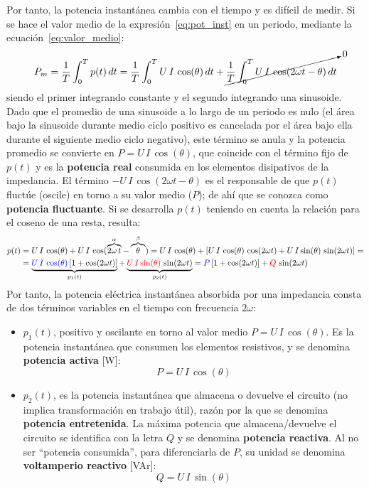Por tanto, la potencia instantánea cambia con el tiempo y es difícil
de medir. Si se hace el valor medio de la
expresión~\eqref{eq:pot_inst} en un periodo, mediante la
ecuación~\eqref{eq:valor_medio}:
\begin{equation*}
  P_m=\dfrac{1}{T}\int_{0}^{T}p(t)\,dt=\dfrac{1}{T}\int_{0}^{T}U\,I\,\cos(\theta)\,dt+\cancelto{0}{\dfrac{1}{T}\int_{0}^{T}U\,I\,\cos(2\omega t-\theta)\,dt}
\end{equation*}
siendo el primer integrando constante y el segundo integrando una
sinusoide. Dado que el promedio de una sinusoide a lo largo de un
periodo es nulo (el área bajo la sinusoide durante medio ciclo
positivo es cancelada por el área bajo ella durante el siguiente medio
ciclo negativo), este término se anula y la potencia promedio se
convierte en $P=U\,I\,\cos(\theta)$, que coincide con el término fijo
de $p(t)$ y es la \textbf{potencia real} consumida en los elementos
disipativos de la impedancia. El término
$-U\,I\,\cos(2\omega t-\theta)$ es el responsable de que $p(t)$
fluctúe (oscile) en torno a su valor medio ($P$); de ahí que se
conozca como \textbf{potencia fluctuante}. Si se desarrolla $p(t)$
teniendo en cuenta la relación para el coseno de una resta, resulta:
\begin{align*}
  p(t)&=U\,I\,\cos(\theta)+U\,I\,\cos(\overbrace{2\omega\,t}^{\alpha}-\overbrace{\theta}^{\beta})=U\,I\,\cos(\theta)+\left[ U\,I\,\cos(\theta)\,\cos(2\omega t) + U\,I\sin(\theta)\,\sin(2\omega t)\right]=\\
      &=\underbrace{{\color{blue}U\,I\,\cos(\theta)}\left[1+\cos(2\omega t)\right]}_{p_1(t)} + \underbrace{{\color{red}U\,I\sin(\theta)}\,\sin(2\omega t)}_{p_2(t)}={\color{blue}P}\left[1+\cos(2\omega t)\right] + {\color{red}Q}\,\sin(2\omega t)
\end{align*}
Por tanto, la potencia eléctrica instantánea absorbida por una
impedancia consta de dos términos variables en el tiempo con
frecuencia $2\omega$:
\begin{itemize}
\item $p_1(t)$, positivo y oscilante en torno al valor medio
  $P=U\,I\,\cos(\theta)$. Es la potencia instantánea que consumen los
  elementos resistivos, y se denomina \textbf{potencia activa} [W]:
  \begin{equation}
    \boxed{P=U\,I\,\cos(\theta)}
  \end{equation}
\item $p_2(t)$, es la potencia instantánea que almacena o devuelve el
  circuito (no implica transformación en trabajo útil), razón por la
  que se denomina \textbf{potencia entretenida}. La máxima potencia
  que almacena/devuelve el circuito se identifica con la letra $Q$ y
  se denomina \textbf{potencia reactiva}. Al no ser ``potencia
  consumida'', para diferenciarla de $P$, su unidad se denomina
  \textbf{voltamperio reactivo} [VAr]:
  \begin{equation}
    \boxed{Q=U\,I\,\sin(\theta)}
  \end{equation}
\end{itemize}
	

